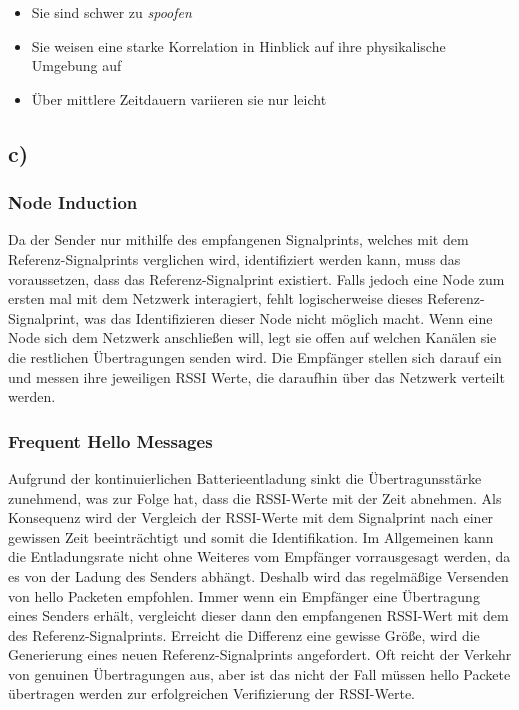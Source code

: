 \documentclass[12pt,a4paper]{article}
\begin{document}
\begin{itemize}
	\item Sie sind schwer zu \textit{spoofen} 
	\item Sie weisen eine starke Korrelation in Hinblick auf ihre 
	physikalische Umgebung auf
	\item Über mittlere Zeitdauern variieren sie nur leicht 
\end{itemize}


\subsection{c)} 

\subsubsection*{Node Induction}
Da der Sender nur mithilfe des empfangenen Signalprints,
welches mit dem Referenz-Signalprints verglichen wird, 
identifiziert werden kann, muss das voraussetzen, dass 
das Referenz-Signalprint existiert. Falls jedoch eine 
Node zum ersten mal mit dem Netzwerk interagiert, fehlt 
logischerweise dieses Referenz-Signalprint, was das 
Identifizieren dieser Node nicht möglich macht. 
Wenn eine Node sich dem Netzwerk anschließen will, legt 
sie offen auf welchen Kanälen sie die restlichen 
Übertragungen senden wird. Die Empfänger stellen sich 
darauf ein und messen ihre jeweiligen RSSI Werte, die 
daraufhin über das Netzwerk verteilt werden. 

\subsubsection*{Frequent Hello Messages}
Aufgrund der kontinuierlichen Batterieentladung sinkt 
die Übertragunsstärke zunehmend, was zur Folge hat, 
dass die RSSI-Werte mit der Zeit abnehmen. 
Als Konsequenz wird der Vergleich der RSSI-Werte mit 
dem Signalprint nach einer gewissen Zeit beeinträchtigt 
und somit die Identifikation.
Im Allgemeinen kann die Entladungsrate nicht ohne Weiteres 
vom Empfänger vorrausgesagt werden, da es von der Ladung 
des Senders abhängt. Deshalb wird das regelmäßige Versenden 
von  \glqq hello\grqq \hspace{0.5mm} Packeten empfohlen.
Immer wenn ein Empfänger eine Übertragung eines Senders erhält, 
vergleicht dieser dann den empfangenen RSSI-Wert mit dem des 
Referenz-Signalprints. Erreicht die Differenz eine gewisse 
Größe, wird die Generierung eines neuen Referenz-Signalprints 
angefordert. Oft reicht der Verkehr von genuinen Übertragungen 
aus, aber ist das nicht der Fall müssen \glqq hello\grqq
\hspace{0.5mm}Packete übertragen werden zur erfolgreichen 
Verifizierung der RSSI-Werte.
\end{document}
